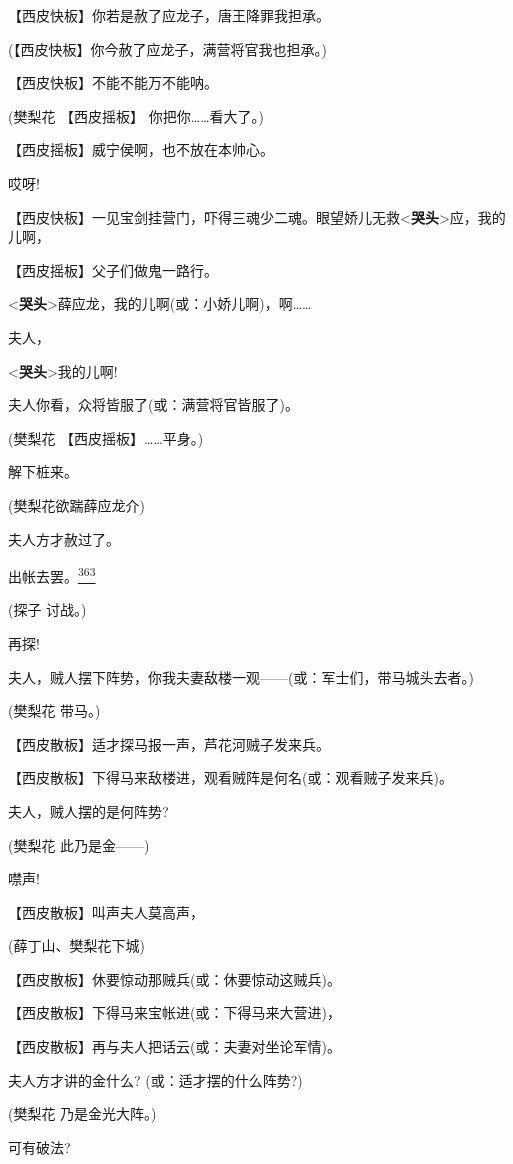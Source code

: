 【西皮快板】你若是赦了应龙子，唐王降罪我担承。

(【西皮快板】你今赦了应龙子，满营将官我也担承。)

【西皮快板】不能不能万不能呐。

(樊梨花 【西皮摇板】 你把你\ldots{}\ldots{}看大了。)

【西皮摇板】威宁侯啊，也不放在本帅心。

哎呀!

【西皮快板】一见宝剑挂营门，吓得三魂少二魂。眼望娇儿无救\textless{}\textbf{哭头}\textgreater{}应，我的儿啊，

【西皮摇板】父子们做鬼一路行。

\textless{}\textbf{哭头}\textgreater{}薛应龙，我的儿啊(或：小娇儿啊)，啊\ldots{}\ldots{}

夫人，

\textless{}\textbf{哭头}\textgreater{}我的儿啊!

夫人你看，众将皆服了(或：满营将官皆服了)。

(樊梨花 【西皮摇板】\ldots{}\ldots{}平身。)

解下桩来。

(樊梨花欲踹薛应龙介)

夫人方才赦过了。

出帐去罢。\protect\hyperlink{fn363}{\textsuperscript{363}}

(探子 讨战。)

再探!

夫人，贼人摆下阵势，你我夫妻敌楼一观------(或：军士们，带马城头去者。)

(樊梨花 带马。)

【西皮散板】适才探马报一声，芦花河贼子发来兵。

【西皮散板】下得马来敌楼进，观看贼阵是何名(或：观看贼子发来兵)。

夫人，贼人摆的是何阵势?

(樊梨花 此乃是金------)

噤声!

【西皮散板】叫声夫人莫高声，

(薛丁山、樊梨花下城)

【西皮散板】休要惊动那贼兵(或：休要惊动这贼兵)。

【西皮散板】下得马来宝帐进(或：下得马来大营进)，

【西皮散板】再与夫人把话云(或：夫妻对坐论军情)。

夫人方才讲的金什么? (或：适才摆的什么阵势?)

(樊梨花 乃是金光大阵。)

可有破法?


